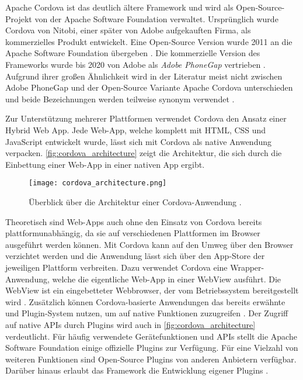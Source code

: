 Apache Cordova ist das deutlich ältere Framework und wird als Open-Source-Projekt von der Apache Software Foundation verwaltet.
Ursprünglich wurde Cordova von Nitobi, einer später von Adobe aufgekauften Firma, als kommerzielles Produkt entwickelt.
Eine Open-Source Version wurde 2011 an die Apache Software Foundation übergeben \cite{Steyer_Cordova}.
Die kommerzielle Version des Frameworks wurde bis 2020 von Adobe als \textit{Adobe PhoneGap} vertrieben \cite{Adobe_PhoneGap_EOL}.
Aufgrund ihrer großen Ähnlichkeit wird in der Literatur meist nicht zwischen Adobe PhoneGap und der Open-Source Variante Apache Cordova unterschieden und beide Bezeichnungen werden teilweise synonym verwendet \cite{Steyer_Cordova,Manchanda_CrossPlatformFrameworks,Rieger_CrossPlatform_EvaluationFramework}.

Zur Unterstützung mehrerer Plattformen verwendet Cordova den Ansatz einer Hybrid Web App.
Jede Web-App, welche komplett mit \ac{HTML}, \ac{CSS} und JavaScript entwickelt wurde, lässt sich mit Cordova als native Anwendung verpacken.
\autoref{fig:cordova_architecture} zeigt die Architektur, die sich durch die Einbettung einer Web-App in einer nativen App ergibt.
\begin{figure}[h]
    \centering
    \texttt{[image: cordova\_architecture.png]}
    \caption{Überblick über die Architektur einer Cordova-Anwendung \cite{Cordova_Overview}.}
    \label{fig:cordova_architecture}
\end{figure}



Theoretisch sind Web-Apps auch ohne den Einsatz von Cordova bereits plattformunabhängig, da sie auf verschiedenen Plattformen im Browser ausgeführt werden können.
Mit Cordova kann auf den Umweg über den Browser verzichtet werden und die Anwendung lässt sich über den App-Store der jeweiligen Plattform verbreiten.
Dazu verwendet Cordova eine Wrapper-Anwendung, welche die eigentliche Web-App in einer WebView ausführt.
Die WebView ist ein eingebetteter Webbrowser, der vom Betriebssystem bereitgestellt wird \cite{Steyer_Cordova}.
Zusätzlich können Cordova-basierte Anwendungen das bereits erwähnte und Plugin-System nutzen, um auf native Funktionen zuzugreifen \cite{Heitkoetter_CrossPlatform_Comparison}.
Der Zugriff auf native \acp{API} durch Plugins wird auch in \autoref{fig:cordova_architecture} verdeutlicht.
Für häufig verwendete Gerätefunktionen und \acp{API} stellt die Apache Software Foundation einige offizielle Plugins zur Verfügung.
Für eine Vielzahl von weiteren Funktionen sind Open-Source Plugins von anderen Anbietern verfügbar. 
Darüber hinaus erlaubt das Framework die Entwicklung eigener Plugins \cite{Cordova_Overview}.

